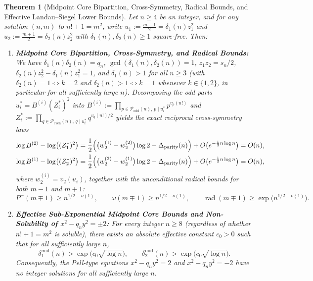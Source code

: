 \documentclass[11pt,reqno]{amsart}
\newtheorem{theorem}{Theorem}[section]
\theoremstyle{remark}
\numberwithin{equation}{section}
\newcommand{\Podd}{\mathcal{P}_{\mathrm{odd}}}
\newcommand{\Peven}{\mathcal{P}_{\mathrm{even}}}
\newcommand{\Dparity}{\Delta_{\mathrm{parity}}}
\DeclareMathOperator{\rad}{rad}
\begin{document}
\begin{theorem}[{Midpoint Core Bipartition, Cross-Symmetry, Radical Bounds, and Effective Landau--Siegel Lower Bounds}]\label{thm:5.2}
Let $n \ge 4$ be an integer, and for any solution $(n, m)$ to $n! + 1 = m^2$, write $u_1 := \frac{m-1}{2} = \delta_1(n)z_1^2$ and $u_2 := \frac{m+1}{2} = \delta_2(n)z_2^2$ with $\delta_1(n), \delta_2(n) \ge 1$ square-free. Then:
\begin{enumerate}
\item[(i)] \textbf{Midpoint Core Bipartition, Cross-Symmetry, and Radical Bounds:} We have $\delta_1(n)\delta_2(n) = q_n$, $\gcd(\delta_1(n), \delta_2(n)) = 1$, $z_1 z_2 = s_n/2$, $\delta_2(n)z_2^2 - \delta_1(n)z_1^2 = 1$, and $\delta_1(n) > 1$ for all $n \ge 3$ (with $\delta_2(n) = 1 \iff k = 2$ and $\delta_2(n) > 1 \iff k = 1$ whenever $k \in \{1, 2\}$, in particular for all sufficiently large $n$). Decomposing the odd parts $u_i^* = B^{(i)}(Z_i^*)^2$ into $B^{(i)} := \prod_{p \in \Podd(n),\, p \mid u_i^*} p^{v_p(n!)}$ and $Z_i^* := \prod_{q \in \Peven(n),\, q \mid u_i^*} q^{v_q(n!)/2}$ yields the exact reciprocal cross-symmetry laws
\begin{equation}\label{eq:5.4}
\begin{aligned}
\log B^{(2)} - \log\bigl((Z_1^*)^2\bigr) &= \frac{1}{2}\Bigl(\bigl(w_2^{(1)} - w_2^{(2)}\bigr)\log 2 - \Dparity(n)\Bigr) + O\bigl(e^{-\frac{1}{3}n\log n}\bigr) = O(n), \\
\log B^{(1)} - \log\bigl((Z_2^*)^2\bigr) &= \frac{1}{2}\Bigl(\bigl(w_2^{(2)} - w_2^{(1)}\bigr)\log 2 - \Dparity(n)\Bigr) + O\bigl(e^{-\frac{1}{3}n\log n}\bigr) = O(n),
\end{aligned}
\end{equation}
where $w_2^{(i)} = v_2(u_i)$, together with the unconditional radical bounds for both $m - 1$ and $m + 1$:
\begin{equation}\label{eq:5.5}
P^+(m \mp 1) \ge n^{1/2-o(1)}, \qquad \omega(m \mp 1) \ge n^{1/2-o(1)}, \qquad \rad(m \mp 1) \ge \exp\bigl(n^{1/2-o(1)}\bigr).
\end{equation}
\item[(ii)] \textbf{Effective Sub-Exponential Midpoint Core Bounds and Non-Solubility of $x^2 - q_n y^2 = \pm 2$:} For every integer $n \ge 8$ (regardless of whether $n! + 1 = m^2$ is soluble), there exists an absolute effective constant $c_0 > 0$ such that for all sufficiently large $n$,
\begin{equation}\label{eq:5.6}
\delta_1^{\mathrm{mid}}(n) > \exp\bigl(c_0\sqrt{\log n}\bigr), \qquad \delta_2^{\mathrm{mid}}(n) > \exp\bigl(c_0\sqrt{\log n}\bigr).
\end{equation}
Consequently, the Pell-type equations $x^2 - q_n y^2 = 2$ and $x^2 - q_n y^2 = -2$ have no integer solutions for all sufficiently large $n$.
\end{enumerate}
\end{theorem}
\end{document}
